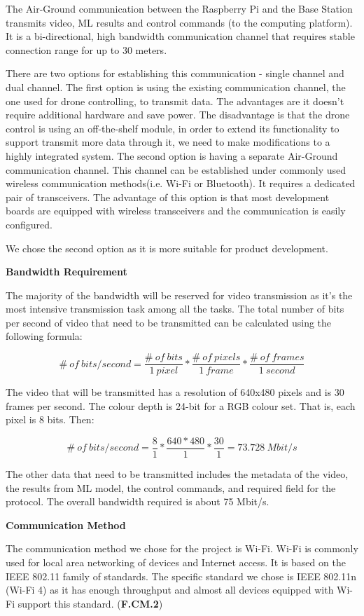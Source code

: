 The Air-Ground communication between the Raspberry Pi and the Base Station transmits video, ML results and control commands (to the computing platform). It is a bi-directional, high bandwidth communication channel that requires stable connection range for up to 30 meters.

There are two options for establishing this communication - single channel and dual channel. The first option is using the existing communication channel, the one used for drone controlling, to transmit data. The advantages are it doesn't require additional hardware and save power. The disadvantage is that the drone control is using an off-the-shelf module, in order to extend its functionality to support transmit more data through it, we need to make modifications to a highly integrated system. The second option is having a separate Air-Ground communication channel. This channel can be established under commonly used wireless communication methods(i.e. Wi-Fi or Bluetooth). It requires a dedicated pair of transceivers. The advantage of this option is that most development boards are equipped with wireless transceivers and the communication is easily configured.

We chose the second option as it is more suitable for product development.

\textbf{Bandwidth Requirement}

The majority of the bandwidth will be reserved for video transmission as it's the most intensive transmission task among all the tasks. The total number of bits per second of video that need to be transmitted can be calculated using the following formula:

\[ \#\:of\:bits/second = \dfrac{\#\:of\:bits}{1\:pixel} * \dfrac{\#\:of\:pixels}{1\:frame} * \dfrac{\#\:of\:frames}{1\:second} \]

The video that will be transmitted has a resolution of 640x480 pixels and is 30 frames per second. The colour depth is 24-bit for a RGB colour set. That is, each pixel is 8 bits. Then:

\[ \#\:of\:bits/second = \dfrac{8}{1} * \dfrac{640*480}{1} * \dfrac{30}{1} = 73.728\:Mbit/s \]

The other data that need to be transmitted includes the metadata of the video, the results from ML model, the control commands, and required field for the protocol. The overall bandwidth required is about 75 Mbit/s.

\textbf{Communication Method}

The communication method we chose for the project is Wi-Fi. Wi-Fi is commonly used for local area networking of devices and Internet access. It is based on the IEEE 802.11 family of standards. The specific standard we chose is IEEE 802.11n (Wi-Fi 4) as it has enough throughput and almost all devices equipped with Wi-Fi support this standard. (\textbf{F.CM.2})

